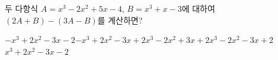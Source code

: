 두 다항식 $A=x^3-2x^2+5x-4$, $B=x^3+x-3$에 대하여 $(2A+B)-(3A-B)$를 계산하면?
\begin{choicesii}{$-x^3+2x^2-3x-2$}{$-x^3+2x^2-3x+2$}{$x^3-2x^2+3x+2$}{$x^3-2x^2-3x+2$}{$x^3+2x^2-3x-2$}\end{choicesii}
